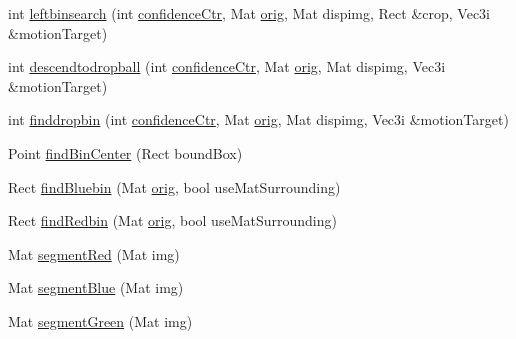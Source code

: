 \begin{DoxyCompactItemize}
\item 
int \hyperlink{classBinsTask_a22689994f60be64be9a708fca637fe64}{leftbinsearch} (int \hyperlink{BinsTask_8cpp_ac559c47f5c7d297de44ad8e157f30eec}{confidence\+Ctr}, Mat \hyperlink{classBinsTask_aedf5f6032dcea5fbab09caed34cf80ac}{orig}, Mat dispimg, Rect \&crop, Vec3i \&motion\+Target)
\item 
int \hyperlink{classBinsTask_ad6bc9c1bb7dfe3a0eba2c12daf9b8251}{descendtodropball} (int \hyperlink{BinsTask_8cpp_ac559c47f5c7d297de44ad8e157f30eec}{confidence\+Ctr}, Mat \hyperlink{classBinsTask_aedf5f6032dcea5fbab09caed34cf80ac}{orig}, Mat dispimg, Vec3i \&motion\+Target)
\item 
int \hyperlink{classBinsTask_a9d4fa38c0a887e585584a58d9c89d588}{finddropbin} (int \hyperlink{BinsTask_8cpp_ac559c47f5c7d297de44ad8e157f30eec}{confidence\+Ctr}, Mat \hyperlink{classBinsTask_aedf5f6032dcea5fbab09caed34cf80ac}{orig}, Mat dispimg, Vec3i \&motion\+Target)
\item 
Point \hyperlink{classBinsTask_ae9a46f2485c946548ec25d19967bdd82}{find\+Bin\+Center} (Rect bound\+Box)
\item 
Rect \hyperlink{classBinsTask_a759535380ae45df16970bed852d95531}{find\+Bluebin} (Mat \hyperlink{classBinsTask_aedf5f6032dcea5fbab09caed34cf80ac}{orig}, bool use\+Mat\+Surrounding)
\item 
Rect \hyperlink{classBinsTask_a9d0f57751e1cf8ce9ed4ea831d326616}{find\+Redbin} (Mat \hyperlink{classBinsTask_aedf5f6032dcea5fbab09caed34cf80ac}{orig}, bool use\+Mat\+Surrounding)
\item 
Mat \hyperlink{classBinsTask_af47b3fa7a02c4dc69641894331773efc}{segment\+Red} (Mat img)
\item 
Mat \hyperlink{classBinsTask_a5bdedfc0921b5ec486c12ffa53398b20}{segment\+Blue} (Mat img)
\item 
Mat \hyperlink{classBinsTask_ad53d8e8e2152cdb8fdd80ca379a1377c}{segment\+Green} (Mat img)
\end{DoxyCompactItemize}

